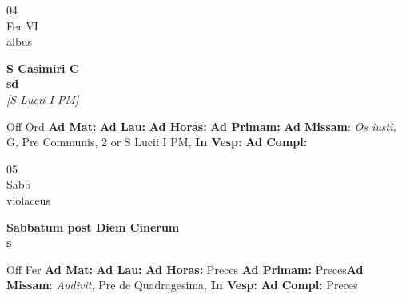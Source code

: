 \documentclass[10pt, openany]{book}
\begin{document}
        \begin{center}
            \begin{minipage}{3.5in}
                \vspace{2em}
                \begin{minipage}{0.5in}
                    {\Huge 04} \\
                    {\normalsize Fer VI} \\
                    {\normalsize albus}
                \end{minipage}
                \begin{minipage}{3.0in}
                    \textbf{ \large S Casimiri C \\
                    \textnormal{\normalsize sd}} \\ \textit{[S Lucii I PM]} \\ 
                \end{minipage}
                \begin{justify}Off Ord
                    \textbf{Ad Mat: }
                    \textbf{Ad Lau: }
                    \textbf{Ad Horas: }
                    \textbf{Ad Primam: }\textbf{Ad Missam}: \textit{Os iusti,} G, Pre Communis, 2 or S Lucii I PM,  
                    \textbf{In Vesp: }
                    \textbf{Ad Compl: }
                \end{justify}
            \end{minipage}
        \end{center}
    
        \begin{center}
            \begin{minipage}{3.5in}
                \vspace{2em}
                \begin{minipage}{0.5in}
                    {\Huge 05} \\
                    {\normalsize Sabb} \\
                    {\normalsize violaceus}
                \end{minipage}
                \begin{minipage}{3.0in}
                    \textbf{ \large Sabbatum post Diem Cinerum \\
                    \textnormal{\normalsize s}} \\ 
                \end{minipage}
                \begin{justify}Off Fer
                    \textbf{Ad Mat: }
                    \textbf{Ad Lau: }
                    \textbf{Ad Horas: }Preces
                    \textbf{Ad Primam: }Preces\textbf{Ad Missam}: \textit{Audivit,} Pre de Quadragesima,  
                    \textbf{In Vesp: }
                    \textbf{Ad Compl: }Preces
                \end{justify}
            \end{minipage}
        \end{center}
    
\end{document}
